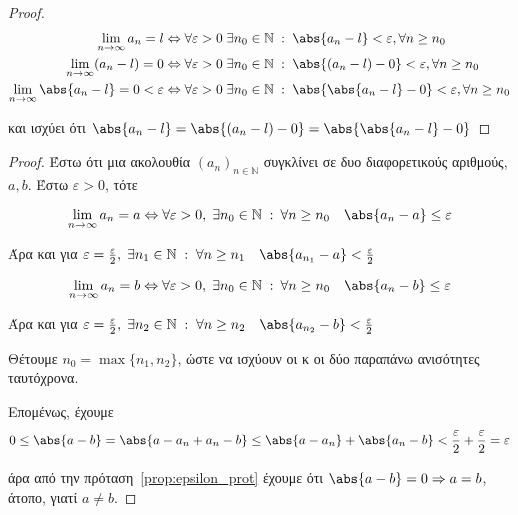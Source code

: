 \documentclass[main.tex]{subfiles}
\begin{document}
\begin{proof}
\item {}
    \begin{align*} 
        \lim_{n \to \infty} a_{n}= l & \Leftrightarrow \forall 
        \varepsilon > 0 \; \exists n_{0} \in \mathbb{N} \; : \; 
        \abs{a_{n}-l} < \varepsilon, \forall n \geq n_{0} \\ 
        \lim_{n \to \infty} (a_{n}-l) = 0 & \Leftrightarrow \forall 
        \varepsilon >0 \; \exists n_{0} \in \mathbb{N} \; : \; 
        \abs {(a_{n}-l) - 0} < \varepsilon , \forall n \geq n_{0} \\
        \lim_{n \to \infty} \abs{a_{n}-l}=0 < \varepsilon & \Leftrightarrow 
        \forall \varepsilon > 0 \; \exists n_{0} \in \mathbb{N} 
        \; : \; \abs {\abs{a_{n}- l } - 0} < \varepsilon, \forall n \geq 
        n_{0} 
    \end{align*}

    και ισχύει ότι $ \abs{a_{n}-l} = \abs{(a_{n}-l)-0} = 
    \abs{\abs{a_{n}- l} -0} $
\end{proof}


\begin{proof}
\item {}
    Έστω ότι μια ακολουθία $ (a_{n})_{n \in \mathbb{N}} $ συγκλίνει σε 
    δυο διαφορετικούς αριθμούς, $ a,b $. Έστω $ \varepsilon >0 $, τότε

    \[ 
        \lim_{n \to \infty} a_{n} = a \Leftrightarrow \forall 
        \varepsilon > 0, \; \exists n_{0} \in \mathbb{N} \; : \: 
        \forall n \geq n_{0} \quad \abs{a_{n}- a} \leq \varepsilon 
    \]

    Άρα και για $ \varepsilon = \frac{\varepsilon}{2}, \; \exists n_{1} \in 
    \mathbb{N} \; : \; \forall n \geq n_{1} \quad \abs{a_{n_{1}} - a} 
    < \frac{\varepsilon}{2}  $

    \[ 
        \lim_{n \to \infty} a_{n} = b \Leftrightarrow \forall 
        \varepsilon > 0, \; \exists n_{0} \in \mathbb{N} \; : \: 
        \forall n \geq n_{0} \quad \abs{a_{n}- b} \leq \varepsilon 
    \]

    Άρα και για $ \varepsilon = \frac{\varepsilon}{2}, \; \exists n_{2} \in 
    \mathbb{N} \; : \; \forall n \geq n_{2}  \quad 
    \abs{a_{n_{2}} - b} < \frac{\varepsilon}{2}  $

    Θέτουμε $ n_{0} = \max \{ n_{1}, n_{2} \} $, ώστε να ισχύουν οι 
    κ οι δύο παραπάνω ανισότητες ταυτόχρονα. 

    Επομένως, έχουμε 
    \[
        0 \leq \abs{a-b} = \abs{a- a_{n}+ a_{n}- b} \leq 
        \abs{a- a_{n}} + \abs{a_{n}- b} < \frac{\varepsilon}{2} + 
        \frac{\varepsilon}{2} = \varepsilon 
    \] 

    άρα από την πρόταση~\ref{prop:epsilon_prot} έχουμε ότι 
    $ \abs{a-b} = 0 \Rightarrow a=b $, άτοπο, γιατί $ a \neq b $.
\end{proof}
\end{document}
